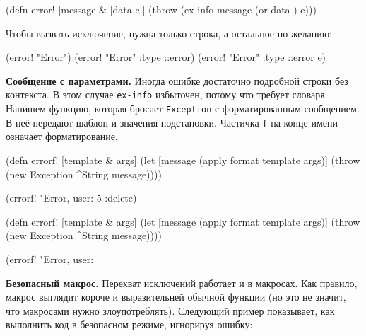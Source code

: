 \else

\begin{english}
  \begin{clojure}
(defn error! [message & [data e]]
  (throw (ex-info message (or data {}) e)))
  \end{clojure}
\end{english}

\fi

\noindent
Чтобы вызвать исключение, нужна только строка, а остальное по желанию:

\begin{english}
  \begin{clojure}
(error! "Error")
(error! "Error" {:type ::error})
(error! "Error" {:type ::error} e)
  \end{clojure}
\end{english}

\textbf{Сообщение с параметрами.} Иногда ошибке достаточно подробной строки без
контекста. В этом случае \verb|ex-info| избыточен, потому что требует
словаря. Напишем функцию, которая бросает \verb|Exception| с форматированным
сообщением. В неё передают шаблон и значения подстановки. Частичка \verb|f| на
конце имени означает форматирование.


\ifnarrow

\begin{english}
  \begin{clojure}
(defn errorf! [template & args]
  (let [message (apply format
                  template args)]
    (throw (new Exception
             ^String message))))

(errorf! "Error, user: %
  5 :delete)
  \end{clojure}
\end{english}

\else

\begin{english}
  \begin{clojure}
(defn errorf! [template & args]
  (let [message (apply format template args)]
    (throw (new Exception ^String message))))

(errorf! "Error, user: %
  \end{clojure}
\end{english}

\fi

\textbf{Безопасный макрос.} Перехват исключений работает и в макросах. Как
правило, макрос выглядит короче и выразительней обычной функции (но это не
значит, что макросами нужно злоупотреблять). Следующий пример показывает, как
выполнить код в безопасном режиме, игнорируя ошибку:

